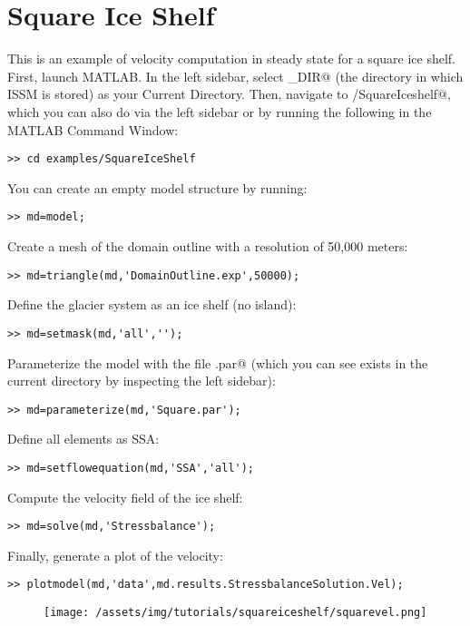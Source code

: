 \section{Square Ice Shelf}
This is an example of velocity computation in steady state for a square ice shelf. First, launch MATLAB. In the left sidebar, select \verb@ISSM_DIR@ (the directory in which ISSM is stored) as your Current Directory. Then, navigate to \verb@examples/SquareIceshelf@, which you can also do via the left sidebar or by running the following in the MATLAB Command Window:
\begin{verbatim}>> cd examples/SquareIceShelf\end{verbatim}

You can create an empty model structure by running:
\begin{verbatim}>> md=model;\end{verbatim}

Create a mesh of the domain outline with a resolution of 50,000 meters:
\begin{verbatim}>> md=triangle(md,'DomainOutline.exp',50000);\end{verbatim}

Define the glacier system as an ice shelf (no island):
\begin{verbatim}>> md=setmask(md,'all','');\end{verbatim}

Parameterize the model with the file \verb@Square.par@ (which you can see exists in the current directory by inspecting the left sidebar):
\begin{verbatim}>> md=parameterize(md,'Square.par');\end{verbatim}

Define all elements as SSA:
\begin{verbatim}>> md=setflowequation(md,'SSA','all');\end{verbatim}

Compute the velocity field of the ice shelf:
\begin{verbatim}>> md=solve(md,'Stressbalance');\end{verbatim}

Finally, generate a plot of the velocity:
\begin{verbatim}>> plotmodel(md,'data',md.results.StressbalanceSolution.Vel);\end{verbatim}

\begin{figure}[H]
	\begin{center}
		\texttt{[image: /assets/img/tutorials/squareiceshelf/squarevel.png]}
	\end{center}
\end{figure}
